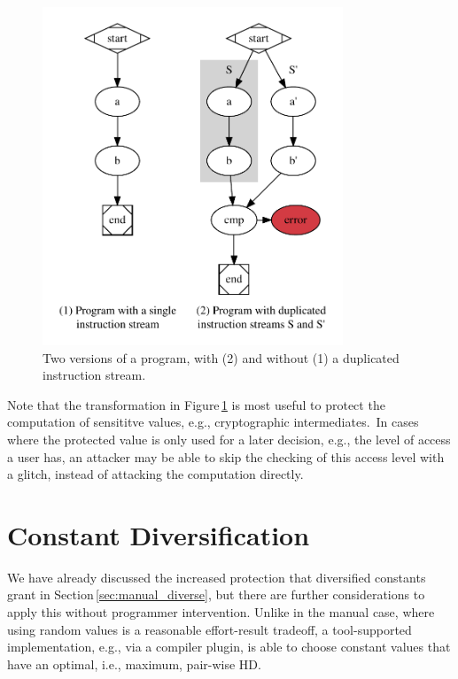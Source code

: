 \begin{figure}
	\includegraphics[width=0.8\textwidth]{instruction_duplication}
	\caption{Two versions of a program, with (2) and without (1) a duplicated instruction stream.}
	\label{fig:duplicated}
\end{figure}

Note that the transformation in Figure\,\ref{fig:duplicated} is most useful to protect the computation of sensititve values, e.g., cryptographic intermediates.\,\cite{boneh1997importance} In cases where the protected value is only used for a later decision, e.g., the level of access a user has, an attacker may be able to skip the checking of this access level with a glitch, instead of attacking the computation directly. 


\section{Constant Diversification}
\label{sec:constant_diverse}
We have already discussed the increased protection that diversified constants grant in Section\,\ref{sec:manual_diverse}, but there are further considerations to apply this without programmer intervention. Unlike in the manual case, where using random values is a reasonable effort-result tradeoff, a tool-supported implementation, e.g., via a compiler plugin, is able to choose constant values that have an optimal, i.e., maximum, pair-wise HD. 


